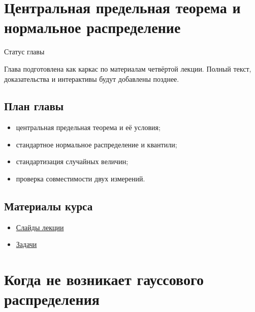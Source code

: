 \documentclass[
  russian,
  letterpaper,
]{scrbook}
\providecommand{\tightlist}{%
  \setlength{\itemsep}{0pt}\setlength{\parskip}{0pt}}
\begin{document}
\chapter{Центральная предельная теорема и нормальное
распределение}\label{ux446ux435ux43dux442ux440ux430ux43bux44cux43dux430ux44f-ux43fux440ux435ux434ux435ux43bux44cux43dux430ux44f-ux442ux435ux43eux440ux435ux43cux430-ux438-ux43dux43eux440ux43cux430ux43bux44cux43dux43eux435-ux440ux430ux441ux43fux440ux435ux434ux435ux43bux435ux43dux438ux435}

{Статус главы}

Глава подготовлена как каркас по материалам четвёртой лекции. Полный
текст, доказательства и интерактивы будут добавлены позднее.

\section{План
главы}\label{ux43fux43bux430ux43d-ux433ux43bux430ux432ux44b-2}

\begin{itemize}
\tightlist
\item
  центральная предельная теорема и её условия;
\item
  стандартное нормальное распределение и квантили;
\item
  стандартизация случайных величин;
\item
  проверка совместимости двух измерений.
\end{itemize}

\section{Материалы
курса}\label{ux43cux430ux442ux435ux440ux438ux430ux43bux44b-ux43aux443ux440ux441ux430-1}

\begin{itemize}
\tightlist
\item
  \href{https://neutrinohit.github.io/statistical-analysis-course/ru/slides/03_central_limit_theorem.html}{Слайды
  лекции}
\item
  \href{https://neutrinohit.github.io/statistical-analysis-course/ru/slides/exercises/03_central_limit_theorem_exercises.html}{Задачи}
\end{itemize}

\chapter{Когда не возникает гауссового
распределения}\label{ux43aux43eux433ux434ux430-ux43dux435-ux432ux43eux437ux43dux438ux43aux430ux435ux442-ux433ux430ux443ux441ux441ux43eux432ux43eux433ux43e-ux440ux430ux441ux43fux440ux435ux434ux435ux43bux435ux43dux438ux44f}
\end{document}
